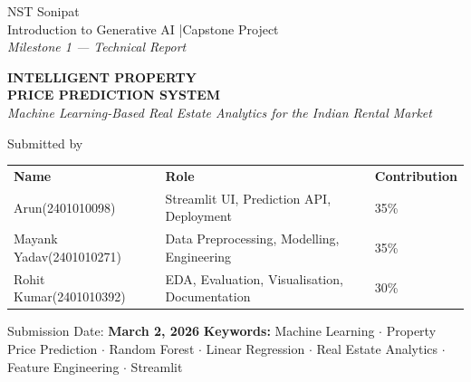 \documentclass[12pt,a4paper]{article}
\newcommand{\RA}{\cellcolor{RowA}}
\newcommand{\RB}{\cellcolor{RowB}}
\begin{document}

\begin{titlepage}\centering
  \vspace*{0.7cm}
  {\large\sffamily\color{Muted}NST Sonipat}\\[4pt]
  {\normalsize\sffamily\color{Muted}Introduction to Generative AI \quad|\quad Capstone Project}\\[4pt]
  {\normalsize\sffamily\itshape\color{Muted}Milestone 1 --- Technical Report}\\[1.8cm]

  \begin{tcolorbox}[enhanced,colback=IceBlue,colframe=Navy,
      boxrule=1.4pt,arc=5pt,left=16pt,right=16pt,top=16pt,bottom=16pt,
      borderline north={4pt}{0pt}{Navy},
      borderline south={4pt}{0pt}{Navy}]
    \centering
    {\LARGE\sffamily\bfseries\color{Navy}
      INTELLIGENT PROPERTY\\[6pt]PRICE PREDICTION SYSTEM}\\[10pt]
    {\large\sffamily\itshape\color{Steel}
      Machine Learning-Based Real Estate Analytics for the Indian Rental Market}
  \end{tcolorbox}

  \vspace{1.5cm}
  {\normalsize\sffamily\color{Muted}Submitted by}\\[8pt]
  \begin{tabular}{lll}
    \rowcolor{TblHead}
    \color{white}\sffamily\bfseries Name &
    \color{white}\sffamily\bfseries Role &
    \color{white}\sffamily\bfseries Contribution \\
    \RA Arun(2401010098)         & Streamlit UI, Prediction API, Deployment      & 35\% \\
    \RB Mayank Yadav(2401010271) & Data Preprocessing, Modelling, Engineering    & 35\% \\
    \RA Rohit Kumar(2401010392)  & EDA, Evaluation, Visualisation, Documentation & 30\% \\
  \end{tabular}

  \vspace{1.5cm}
  {\normalsize\sffamily\color{Muted}Submission Date: \textbf{March 2, 2026}}
  \vfill
  {\small\sffamily\color{Muted}
    \textbf{Keywords:} Machine Learning $\cdot$ Property Price Prediction $\cdot$
    Random Forest $\cdot$ Linear Regression $\cdot$ Real Estate Analytics $\cdot$
    Feature Engineering $\cdot$ Streamlit}
\end{titlepage}
\end{document}
